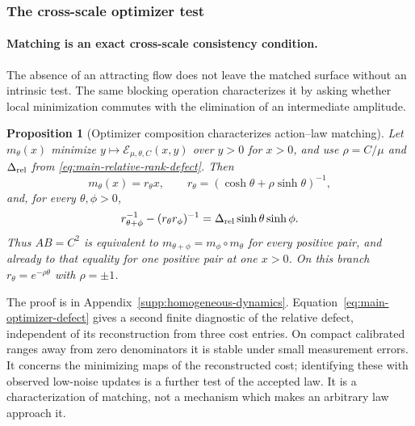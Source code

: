 \documentclass[11pt]{article}
\numberwithin{equation}{section}
\newtheorem{proposition}[proposition]{Proposition}
\theoremstyle{definition}
\theoremstyle{remark}
\begin{document}
\subsubsection{The cross-scale optimizer test}

\paragraph{Matching is an exact cross-scale consistency condition.}
The absence of an attracting flow does not leave the matched surface without
an intrinsic test.  The same blocking operation characterizes it by asking
whether local minimization commutes with the elimination of an intermediate
amplitude.

\begin{proposition}[Optimizer composition characterizes action--law matching]
\label{prop:main-optimizer-composition}
Let $m_\theta(x)$ minimize
$y\mapsto\mathcal E_{\mu,\theta,C}(x,y)$ over $y>0$ for $x>0$, and use
$\rho=C/\mu$ and $\Delta_{\rm rel}$ from
\eqref{eq:main-relative-rank-defect}.  Then
\begin{equation}
 m_\theta(x)=r_\theta x,\qquad
 r_\theta=(\cosh\theta+\rho\sinh\theta)^{-1},
 \label{eq:main-optimizer-map}
\end{equation}
and, for every $\theta,\phi>0$,
\begin{equation}
 r_{\theta+\phi}^{-1}-(r_\theta r_\phi)^{-1}
       =\Delta_{\rm rel}\sinh\theta\sinh\phi.
 \label{eq:main-optimizer-defect}
\end{equation}
Thus $AB=C^2$ is equivalent to
$m_{\theta+\phi}=m_\phi\circ m_\theta$ for every positive pair, and already
to that equality for one positive pair at one $x>0$.  On this branch
$r_\theta=e^{-\rho\theta}$ with $\rho=\pm1$.
\end{proposition}

The proof is in Appendix~\ref{supp:homogeneous-dynamics}.
Equation~\eqref{eq:main-optimizer-defect} gives a second finite diagnostic of
the relative defect, independent of its reconstruction from three cost
entries.  On compact calibrated ranges away from zero denominators it is
stable under small measurement errors.  It concerns the minimizing maps of
the reconstructed cost; identifying these with observed low-noise updates is
a further test of the accepted law.  It is a characterization of matching,
not a mechanism which makes an arbitrary law approach it.
\end{document}
